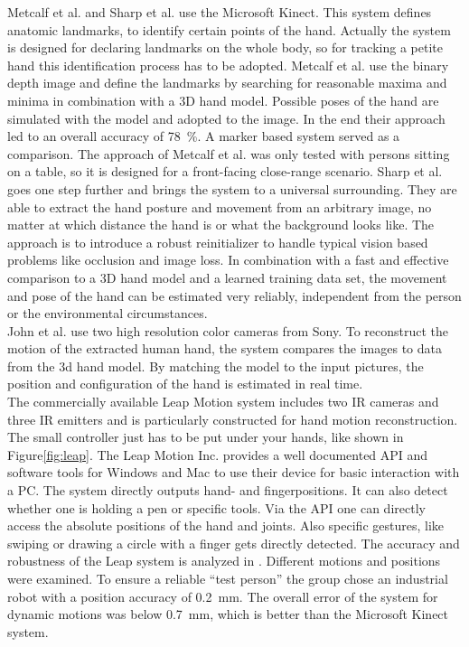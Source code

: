 Metcalf et al. and Sharp et al. use the Microsoft Kinect. This system defines anatomic landmarks, to identify certain points of the hand. Actually the system is designed for declaring landmarks on the whole body, so for tracking a petite hand this identification process has to be adopted. Metcalf et al. use the binary depth image and define the landmarks by searching for reasonable maxima and minima in combination with a 3D hand model. Possible poses of the hand are simulated with the model and adopted to the image. In the end their approach led to an overall accuracy of \SI{78}{\percent}. A marker based system served as a comparison. The approach of Metcalf et al. was only tested with persons sitting on a table, so it is designed for a front-facing close-range scenario. Sharp et al. goes one step further and brings the system to a universal surrounding. They are able to extract the hand posture and movement from an arbitrary image, no matter at which distance the hand is or what the background looks like. The approach is to introduce a robust reinitializer to handle typical vision based problems like occlusion and image loss. In combination with a fast and effective comparison to a 3D hand model and a learned training data set, the movement and pose of the hand can be estimated very reliably, independent from the person or the environmental circumstances.\\
John et al. use two high resolution color cameras from Sony. To reconstruct the motion of the extracted human hand, the system compares the images to data from the 3d hand model. By matching the model to the input pictures, the position and configuration of the hand is estimated in real time.\\
The commercially available Leap Motion system \cite{leap} includes two IR cameras and three IR emitters and is particularly constructed for hand motion reconstruction. The small controller just has to be put under your hands, like shown in Figure\ref{fig:leap}. The Leap Motion Inc. provides a well documented API and software tools for Windows and Mac to use their device for basic interaction with a PC. The system directly outputs hand- and fingerpositions. It can also detect whether one is holding a pen or specific tools. Via the API one can directly access the absolute positions of the hand and joints. Also specific gestures, like swiping or drawing a circle with a finger gets directly detected. The accuracy and robustness of the Leap system is analyzed in \cite{weichert2013analysis}. Different motions and positions were examined. To ensure a reliable ``test person'' the group chose an industrial robot with a position accuracy of \SI{0.2}{mm}. The overall error of the system for dynamic motions was below \SI{0.7}{\mm}, which is better than the Microsoft Kinect system.\\
